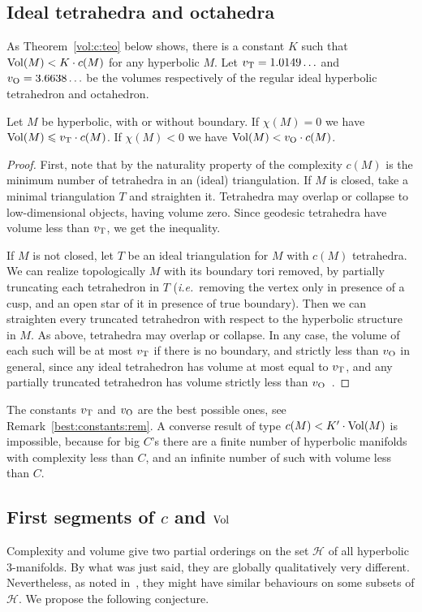 \documentclass[10pt]{article}      %
\newcommand{\calH} {\ensuremath {\mathcal{H}}}
\newcommand{\Vol}{{\rm Vol}}
\newcommand{\voltet}{v_{\rm T}}
\begin{document}
\subsection{Ideal tetrahedra and octahedra}
As Theorem~\ref{vol:c:teo} below shows, there is a constant $K$ such that
${\rm Vol} (M)< K \cdot c(M)$ for any hyperbolic $M$.
Let $v_{\rm T} = 1.0149\ldots $ and $v_{\rm O} = 3.6638\ldots$ be the volumes 
respectively of the regular ideal hyperbolic tetrahedron and octahedron.
\begin{theorem} \label{vol:c:teo}
Let $M$ be hyperbolic, with or without boundary. 
If $\chi(M)=0$ we have ${\rm Vol}(M) \leqslant v_{\rm T}\cdot c(M)$. 
If $\chi(M)<0$ we have ${\rm Vol} (M)< v_{\rm O}\cdot c(M)$.
\end{theorem}
\begin{proof}
First, note that by the naturality property of the complexity $c(M)$ is
the minimum number of tetrahedra in an (ideal) triangulation.
If $M$ is closed, take a minimal triangulation $T$ and straighten it. 
Tetrahedra may overlap or collapse to low-dimensional objects, having
volume zero. Since geodesic tetrahedra have volume less than $\voltet$,
we get the inequality.

If $M$ is not closed, let $T$ be an ideal triangulation for $M$ 
with $c(M)$ tetrahedra. 
We can realize topologically $M$ with its boundary tori removed, 
by partially truncating
each tetrahedron in $T$ (\emph{i.e.}~removing the vertex only in presence of 
a cusp, and an open
star of it in presence of true boundary). Then we can
straighten every truncated tetrahedron with respect to the hyperbolic structure in $M$.
As above, tetrahedra may overlap or collapse. 
In any case,
the volume of each such will be at most $v_{\rm T}$ if there is no boundary, and strictly less than
$v_{\rm O}$ in general, since any ideal tetrahedron has volume at most equal to $v_{\rm T}$,
and any partially truncated tetrahedron has volume strictly less than $v_{\rm O}$~\cite{Ush}.
\end{proof}

The constants $v_{\rm T}$ and $v_{\rm O}$ are the best possible ones, see 
Remark~\ref{best:constants:rem}.
A converse result of type $c(M) < K' \cdot {\rm Vol} (M)$ is impossible,
because for big $C$'s there are a finite number of hyperbolic manifolds 
with complexity
less than $C$, and an infinite number of such with volume less than $C$.

\subsection{First segments of $c$ and $\Vol$}
Complexity and volume give two partial orderings on the set $\calH$ of all hyperbolic
3-manifolds. By what was just said, they are globally qualitatively very different.
Nevertheless, as noted in~\cite{MaFo}, they might have similar behaviours
on some subsets of $\calH$. We propose the following conjecture.
\end{document}
